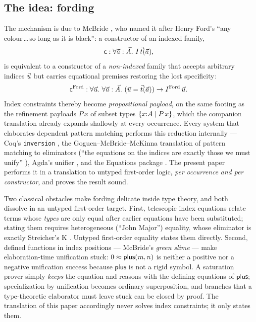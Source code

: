 \subsection{The idea: fording}
\label{sec:intro-idea}

The mechanism is due to McBride \cite[\S 3.5]{McBride1999}, who named it
after Henry Ford's ``any colour\,\dots\,so long as it is black'': a
constructor of an indexed family,
\[
  \wcns{c} : \forall \tup{a} : \tup{A}.\ I\,\tup{t}(\tup{a}),
\]
is equivalent to a constructor of a \emph{non-indexed} family that accepts
arbitrary indices $\vec{u}$ but carries equational premises restoring the
lost specificity:
\[
  \mathsf{c}^{\mathrm{Ford}} :
  \forall \vec{u}.\ \forall \vec{a} : \vec{A}.\
  (\vec{u} = \vec{t}(\vec{a})) \to I^{\mathrm{Ford}}\,\vec{u}.
\]
Index constraints thereby become \emph{propositional payload}, on the same
footing as the refinement payloads $P\,x$ of subset types
$\{x{:}A \mid P\,x\}$, which the companion translation already expands
shallowly at every occurrence.  Every system that elaborates dependent
pattern matching performs this reduction internally --- Coq's
\texttt{inversion} \cite{CornesTerrasse1995,Monin2010}, the
Goguen--McBride--McKinna translation of pattern matching to eliminators
(``the equations on the indices are exactly those we must unify''
\cite{GoguenEtAl2006}), Agda's unifier \cite{CockxEtAl2014,CockxDevriese2018},
and the Equations package \cite{SozeauMangin2019}.  The present paper
performs it in a translation to untyped first-order logic, \emph{per
occurrence and per constructor}, and proves the result sound.

Two classical obstacles make fording delicate inside type theory, and both
dissolve in an untyped first-order target.  First, telescopic index
equations relate terms whose \emph{types} are only equal after earlier
equations have been substituted; stating them requires heterogeneous
(``John Major'') equality, whose eliminator is exactly Streicher's K
\cite{McBride1999,CockxEtAl2014}.  Untyped first-order equality states
them directly.  Second, defined functions in index positions ---
McBride's \emph{green slime} \cite{McBride2014} --- make elaboration-time
unification stuck: $0 \approx \mathsf{plus}(m,n)$ is neither a positive nor
a negative unification success because $\mathsf{plus}$ is not a rigid
symbol.  A saturation prover simply \emph{keeps} the equation and reasons
with the defining equations of $\mathsf{plus}$; specialization by
unification becomes ordinary superposition, and branches that a
type-theoretic elaborator must leave stuck can be closed by proof.  The
translation of this paper accordingly never solves index constraints; it
only states them.

